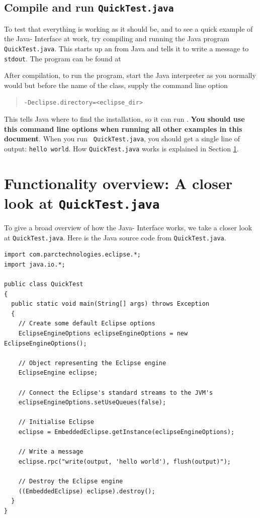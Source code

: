 \subsection{Compile and run {\tt QuickTest.java}}
\label{sec:ji-testing-ji}
To test that everything is working as it should be, and to see a quick
example of the Java-{\eclipse} Interface at work, try compiling and
running the Java program {\tt QuickTest.java}. This starts up an
{\eclipse} from Java and tells it to write a message to {\tt stdout}. The
program can be found at
\begin{quote}
\end{quote}

After compilation, to run the program, start the Java interpreter as
you normally would but before the name of the class, supply the
command line option
\begin{quote}
{\tt -Declipse.directory=<eclipse\_dir>}
\end{quote}
This tells Java where to find the {\eclipse} installation, so it can run
{\eclipse}. {\bf You should use this command line options when running
all other examples in this document}. When you run {\tt
QuickTest.java}, you should get a single line of output: {\tt hello
world}. How {\tt QuickTest.java} works is explained in Section
\ref{sec:ji-closer-look}.

\section{Functionality overview: A closer look at {\tt QuickTest.java}}
\label{sec:ji-closer-look}

To give a broad overview of how the Java-{\eclipse} Interface works,
we take a closer look at {\tt QuickTest.java}. Here is the Java source
code from {\tt QuickTest.java}.
\begin{verbatim}
import com.parctechnologies.eclipse.*;
import java.io.*;

public class QuickTest
{
  public static void main(String[] args) throws Exception
  {
    // Create some default Eclipse options
    EclipseEngineOptions eclipseEngineOptions = new EclipseEngineOptions();

    // Object representing the Eclipse engine
    EclipseEngine eclipse;

    // Connect the Eclipse's standard streams to the JVM's
    eclipseEngineOptions.setUseQueues(false);

    // Initialise Eclipse
    eclipse = EmbeddedEclipse.getInstance(eclipseEngineOptions);

    // Write a message
    eclipse.rpc("write(output, 'hello world'), flush(output)");

    // Destroy the Eclipse engine
    ((EmbeddedEclipse) eclipse).destroy();
  }
}

\end{verbatim}

